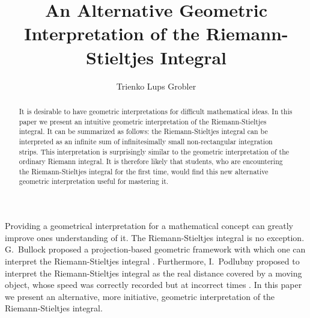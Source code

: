 \documentclass{article}
\theoremstyle{theorem}
\theoremstyle{definition}
\begin{document}
\title{An Alternative Geometric Interpretation of the Riemann-Stieltjes Integral}
\author{Trienko Lups Grobler}

\maketitle

\begin{abstract}
It is desirable to have geometric interpretations for difficult mathematical ideas. In this paper we present an intuitive geometric interpretation of the Riemann-Stieltjes integral. It can be 
summarized as follows: the Riemann-Stieltjes integral can be interpreted as an infinite sum of infinitesimally small non-rectangular 
integration strips. This interpretation is surprisingly similar to the geometric interpretation of the ordinary Riemann integral. 
It is therefore likely that students, who are encountering the Riemann-Stieltjes integral for the first time, would find this new alternative geometric interpretation useful for mastering it.
\end{abstract}

\noindent
Providing a geometrical interpretation for a mathematical concept can greatly improve ones understanding of it. The Riemann-Stieltjes 
integral is no exception. G.~Bullock proposed a projection-based geometric framework with which one can interpret the Riemann-Stieltjes 
integral \cite{bullock1988}. Furthermore, I.~Podlubny proposed to interpret the Riemann-Stieltjes integral as the real distance covered by a moving object, whose speed was 
correctly recorded but at incorrect times \cite{podlubny2002}. In this paper we present an alternative, more initiative, geometric interpretation of the Riemann-Stieltjes integral.\\
\end{document}
